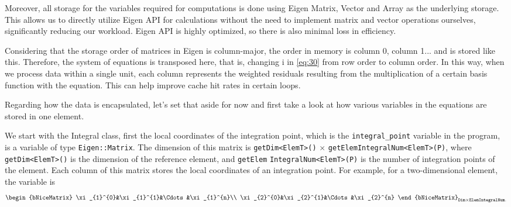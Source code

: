 \documentclass{develop-note}
\begin{document}
Moreover, all storage for the variables required for computations is done using Eigen Matrix, Vector and Array as the underlying storage. This allows us to directly utilize Eigen API for calculations without the need to implement matrix and vector operations ourselves, significantly reducing our workload. Eigen API is highly optimized, so there is also minimal loss in efficiency.

Considering that the storage order of matrices in Eigen is column-major, the order in memory is column 0, column 1... and is stored like this. Therefore, the system of equations is transposed here, that is, changing i in \autoref{eq:30} from row order to column order. In this way, when we process data within a single unit, each column represents the weighted residuals resulting from the multiplication of a certain basis function with the equation. This can help improve cache hit rates in certain loops.

Regarding how the data is encapsulated, let's set that aside for now and first take a look at how various variables in the equations are stored in one element.

We start with the Integral class, first the local coordinates of the integration point, which is the \texttt{integral\_point} variable in the program, is a variable of type \texttt{Eigen::Matrix}. The dimension of this matrix is \texttt{getDim<ElemT>()} $\times$ \texttt{getElemIntegralNum<ElemT>(P)}, where \texttt{getDim<ElemT>()} is the dimension of the reference element, and \texttt{getElem} \texttt{IntegralNum<ElemT>(P)} is the number of integration points of the element. Each column of this matrix stores the local coordinates of an integration point. For example, for a two-dimensional element, the variable is
\begin{equation}
  \begin{bNiceMatrix}
    \xi_{1}^{0}&\xi_{1}^{1}&\Cdots&\xi_{1}^{n}\\
    \xi_{2}^{0}&\xi_{2}^{1}&\Cdots&\xi_{2}^{n}
  \end{bNiceMatrix}_{\texttt{Dim}\times\texttt{ElemIntegralNum}.}
\end{equation}

\end{document}

